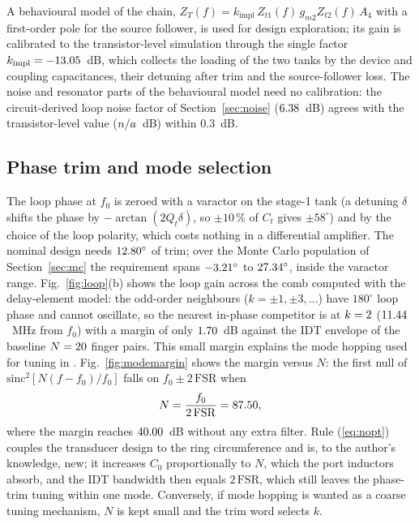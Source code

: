 \documentclass[journal]{IEEEtran}
\begin{document}
A behavioural model of the chain, $Z_T(f)=k_{\mathrm{impl}}\,Z_{t1}(f)\,g_{m2}Z_{t2}(f)\,A_4$ with a first-order pole for the source follower, is used for design exploration; its gain is calibrated to the transistor-level simulation through the single factor $k_{\mathrm{impl}}=-13.05$~dB, which collects the loading of the two tanks by the device and coupling capacitances, their detuning after trim and the source-follower loss. The noise and resonator parts of the behavioural model need no calibration: the circuit-derived loop noise factor of Section~\ref{sec:noise} ($6.38$~dB) agrees with the transistor-level value ($n/a$~dB) within 0.3~dB.

\subsection{Phase trim and mode selection}\label{sec:mode}
The loop phase at $f_0$ is zeroed with a varactor on the stage-1 tank (a detuning $\delta$ shifts the phase by $-\arctan(2Q_t\delta)$, so $\pm10$\,\% of $C_t$ gives $\pm58^\circ$) and by the choice of the loop polarity, which costs nothing in a differential amplifier. The nominal design needs $12.80^\circ$ of trim; over the Monte Carlo population of Section~\ref{sec:mc} the requirement spans $-3.21^\circ$ to $27.34^\circ$, inside the varactor range. Fig.~\ref{fig:loop}(b) shows the loop gain across the comb computed with the delay-element model: the odd-order neighbours ($k=\pm1,\pm3,\dots$) have $180^\circ$ loop phase and cannot oscillate, so the nearest in-phase competitor is at $k=2$ ($11.44$~MHz from $f_0$) with a margin of only $1.70$~dB against the IDT envelope of the baseline $N=20$ finger pairs. This small margin explains the mode hopping used for tuning in \cite{ji2026}. Fig.~\ref{fig:modemargin} shows the margin versus $N$: the first null of $\mathrm{sinc}^2[N(f-f_0)/f_0]$ falls on $f_0\pm2\,\mathrm{FSR}$ when
\begin{equation}
N=\frac{f_0}{2\,\mathrm{FSR}}=87.50,
\label{eq:nopt}
\end{equation}
where the margin reaches $40.00$~dB without any extra filter. Rule (\ref{eq:nopt}) couples the transducer design to the ring circumference and is, to the author's knowledge, new; it increases $C_0$ proportionally to $N$, which the port inductors absorb, and the IDT bandwidth then equals $2\,\mathrm{FSR}$, which still leaves the phase-trim tuning within one mode. Conversely, if mode hopping is wanted as a coarse tuning mechanism, $N$ is kept small and the trim word selects $k$.
\end{document}
